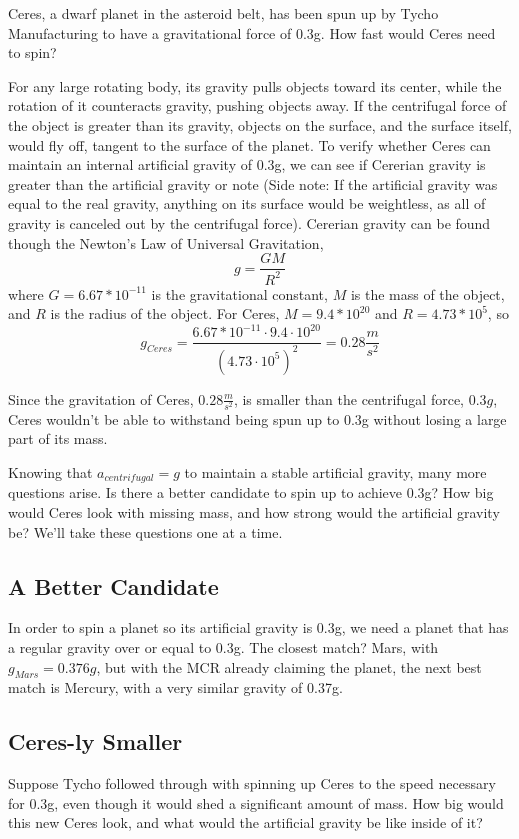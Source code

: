 \documentclass{amsart}
\theoremstyle{definition}
\begin{document}
Ceres, a dwarf planet in the asteroid belt, has been spun up by Tycho Manufacturing to have a gravitational force of $0.3$g. How fast would Ceres need to spin?

For any large rotating body, its gravity pulls objects toward its center, while the rotation of it counteracts gravity, pushing objects away. If the centrifugal force of the object is greater than its gravity, objects on the surface, and the surface itself, would fly off, tangent to the surface of the planet. To verify whether Ceres can maintain an internal artificial gravity of 0.3g, we can see if Cererian gravity is greater than the artificial gravity or note (Side note: If the artificial gravity was equal to the real gravity, anything on its surface would be weightless, as all of gravity is canceled out by the centrifugal force). Cererian gravity can be found though the Newton's Law of Universal Gravitation,
\[
g=\frac{GM}{R^2}
\]
where \(G=6.67*10^{-11}\) is the gravitational constant, \(M\) is the mass of the object, and \(R\) is the radius of the object. For Ceres, \(M=9.4*10^{20}\) and \(R=4.73*10^5\), so
\[
g_{Ceres}=\frac{6.67*10^{-11}\cdot 9.4\cdot 10^{20}}{(4.73\cdot10^5)^2}=0.28\frac{m}{s^2}
\]

Since the gravitation of Ceres, $0.28 \frac{m}{s^2}$, is smaller than the centrifugal force, $0.3g$, Ceres wouldn't be able to withstand being spun up to 0.3g without losing a large part of its mass.

Knowing that $a_{centrifugal} = g$ to maintain a stable artificial gravity, many more questions arise. Is there a better candidate to spin up to achieve 0.3g? How big would Ceres look with missing mass, and how strong would the artificial gravity be? We'll take these questions one at a time.

\subsection{A Better Candidate}
In order to spin a planet so its artificial gravity is 0.3g, we need a planet that has a regular gravity over or equal to 0.3g. The closest match? Mars, with \(g_{Mars} = 0.376g\), but with the MCR already claiming the planet, the next best match is Mercury, with a very similar gravity of 0.37g.

\subsection{Ceres-ly Smaller}
Suppose Tycho followed through with spinning up Ceres to the speed necessary for 0.3g, even though it would shed a significant amount of mass. How big would this new Ceres look, and what would the artificial gravity be like inside of it?
\end{document}
